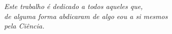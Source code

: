 \vspace*{\fill}
   \centering
   \noindent
   \textit{Este trabalho é dedicado a todos aqueles que,\\
   de alguma forma abdicaram de algo e\/ou a si mesmos\\
   pela Ciência.} \vspace*{\fill}
